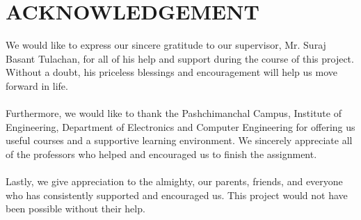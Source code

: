 \chapter*{ACKNOWLEDGEMENT}
\justify
We would like to express our sincere gratitude to our supervisor, Mr. Suraj Basant Tulachan, for all of his help and support during the course of this project. Without a doubt, his priceless blessings and encouragement will help us move forward in life.\\
\\
Furthermore, we would like to thank the Pashchimanchal Campus, Institute of Engineering, Department of Electronics and Computer Engineering for offering us useful courses and a supportive learning environment. We sincerely appreciate all of the professors who helped and encouraged us to finish the assignment.\\
\\
Lastly, we give appreciation to the almighty, our parents, friends, and everyone who has consistently supported and encouraged us. This project would not have been possible without their help.\\
